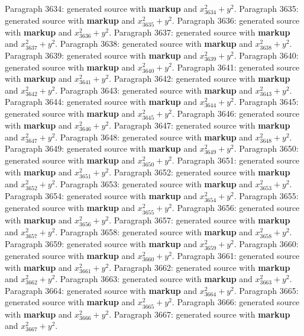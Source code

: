 \documentclass{article}
\begin{document}
Paragraph 3634: generated source with \textbf{markup} and $x_{3634}^2 + y^2$.
Paragraph 3635: generated source with \textbf{markup} and $x_{3635}^2 + y^2$.
Paragraph 3636: generated source with \textbf{markup} and $x_{3636}^2 + y^2$.
Paragraph 3637: generated source with \textbf{markup} and $x_{3637}^2 + y^2$.
Paragraph 3638: generated source with \textbf{markup} and $x_{3638}^2 + y^2$.
Paragraph 3639: generated source with \textbf{markup} and $x_{3639}^2 + y^2$.
Paragraph 3640: generated source with \textbf{markup} and $x_{3640}^2 + y^2$.
Paragraph 3641: generated source with \textbf{markup} and $x_{3641}^2 + y^2$.
Paragraph 3642: generated source with \textbf{markup} and $x_{3642}^2 + y^2$.
Paragraph 3643: generated source with \textbf{markup} and $x_{3643}^2 + y^2$.
Paragraph 3644: generated source with \textbf{markup} and $x_{3644}^2 + y^2$.
Paragraph 3645: generated source with \textbf{markup} and $x_{3645}^2 + y^2$.
Paragraph 3646: generated source with \textbf{markup} and $x_{3646}^2 + y^2$.
Paragraph 3647: generated source with \textbf{markup} and $x_{3647}^2 + y^2$.
Paragraph 3648: generated source with \textbf{markup} and $x_{3648}^2 + y^2$.
Paragraph 3649: generated source with \textbf{markup} and $x_{3649}^2 + y^2$.
Paragraph 3650: generated source with \textbf{markup} and $x_{3650}^2 + y^2$.
Paragraph 3651: generated source with \textbf{markup} and $x_{3651}^2 + y^2$.
Paragraph 3652: generated source with \textbf{markup} and $x_{3652}^2 + y^2$.
Paragraph 3653: generated source with \textbf{markup} and $x_{3653}^2 + y^2$.
Paragraph 3654: generated source with \textbf{markup} and $x_{3654}^2 + y^2$.
Paragraph 3655: generated source with \textbf{markup} and $x_{3655}^2 + y^2$.
Paragraph 3656: generated source with \textbf{markup} and $x_{3656}^2 + y^2$.
Paragraph 3657: generated source with \textbf{markup} and $x_{3657}^2 + y^2$.
Paragraph 3658: generated source with \textbf{markup} and $x_{3658}^2 + y^2$.
Paragraph 3659: generated source with \textbf{markup} and $x_{3659}^2 + y^2$.
Paragraph 3660: generated source with \textbf{markup} and $x_{3660}^2 + y^2$.
Paragraph 3661: generated source with \textbf{markup} and $x_{3661}^2 + y^2$.
Paragraph 3662: generated source with \textbf{markup} and $x_{3662}^2 + y^2$.
Paragraph 3663: generated source with \textbf{markup} and $x_{3663}^2 + y^2$.
Paragraph 3664: generated source with \textbf{markup} and $x_{3664}^2 + y^2$.
Paragraph 3665: generated source with \textbf{markup} and $x_{3665}^2 + y^2$.
Paragraph 3666: generated source with \textbf{markup} and $x_{3666}^2 + y^2$.
Paragraph 3667: generated source with \textbf{markup} and $x_{3667}^2 + y^2$.
\end{document}
